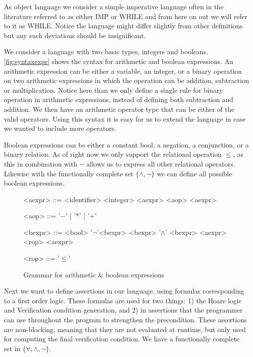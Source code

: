 As object language we consider a simple imperative language often in the literature referred to
as either IMP or WHILE and from here on out we will refer to it as WHILE.
Notice the language might differ slightly from other definitions but any such deviations should be insignificant.

We consider a language with two basic types, integers and booleans.
\autoref{fig:syntaxexpr} shows the syntax for arithmetic and boolean expressions.
An arithmetic expression can be either a variable, an integer, or a binary operation on two arithmetic expressions in which the operation can be addition, subtraction or multiplication.
Notice here than we only define a single rule for binary operation in arithmetic expressions, instead of defining both subtraction and addition. We then have an arithmetic operator type
that can be either of the valid operators.
Using this syntax it is easy for us to extend the language in case we wanted to include more operators.

Boolean expressions can be either a constant bool, a negation, a conjunction, or a binary relation. As of right now we only support the relational operation $\leq$, as this in combination with $\neg$ allows us to express all other relational operators.
Likewise with the functionally complete set $\{\wedge, \neg\}$ we can define all possible boolean expressions.

\begin{figure}[H]
\centering
\begin{grammar}
<aexpr> ::= <identifier>
\alt <integer>
\alt <aexpr> <aop> <aexpr>

<aop> ::= '$-$' | '$*$' | '$+$'

<bexpr> ::= <bool>
\alt '$\neg$'<bexpr>
\alt <bexpr> '$\wedge$' <bexpr>
\alt <aexpr> <rop> <aexpr>

<rop> ::= '$\leq$'
\end{grammar}
\caption{Grammar for arithmetic \& boolean expressions}
\label{fig:syntaxexpr}
\end{figure}

Next we want to define assertions in our language, using formulas corresponding to a first order logic.
These formulas are used for two things: 1) the Hoare logic and Verification condition generation,
and 2) in assertions that the programmer can use throughout the program to strengthen the
precondition. These assertions are non-blocking, meaning that they are not evaluated at runtime,
but only used for computing the final verification condition.
We have a functionally complete set in $\{\forall, \wedge, \neg\}$.

